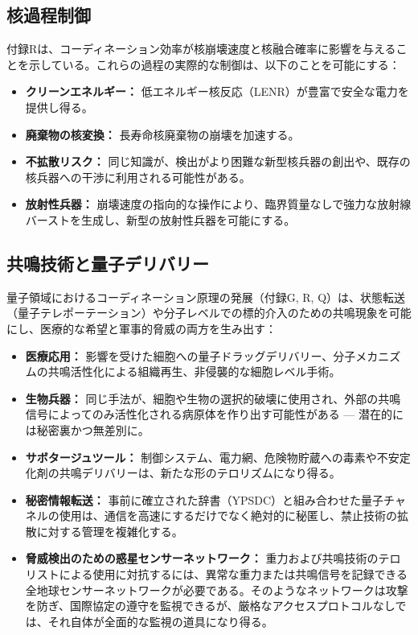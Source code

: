 \documentclass[12pt,a4paper]{article}
\theoremstyle{remark}
\begin{document}
	\subsection{核過程制御}
	\label{subsec:nuclear}
	
	付録Rは、コーディネーション効率が核崩壊速度と核融合確率に影響を与えることを示している。これらの過程の実際的な制御は、以下のことを可能にする：
	\begin{itemize}[leftmargin=*]
		\item \textbf{クリーンエネルギー：} 低エネルギー核反応（LENR）が豊富で安全な電力を提供し得る。
		\item \textbf{廃棄物の核変換：} 長寿命核廃棄物の崩壊を加速する。
		\item \textbf{不拡散リスク：} 同じ知識が、検出がより困難な新型核兵器の創出や、既存の核兵器への干渉に利用される可能性がある。
		\item \textbf{放射性兵器：} 崩壊速度の指向的な操作により、臨界質量なしで強力な放射線バーストを生成し、新型の放射性兵器を可能にする。
	\end{itemize}
	
	\subsection{共鳴技術と量子デリバリー}
	\label{subsec:resonance}
	
	量子領域におけるコーディネーション原理の発展（付録G, R, Q）は、状態転送（量子テレポーテーション）や分子レベルでの標的介入のための共鳴現象を可能にし、医療的な希望と軍事的脅威の両方を生み出す：
	\begin{itemize}[leftmargin=*]
		\item \textbf{医療応用：} 影響を受けた細胞への量子ドラッグデリバリー、分子メカニズムの共鳴活性化による組織再生、非侵襲的な細胞レベル手術。
		\item \textbf{生物兵器：} 同じ手法が、細胞や生物の選択的破壊に使用され、外部の共鳴信号によってのみ活性化される病原体を作り出す可能性がある — 潜在的には秘密裏かつ無差別に。
		\item \textbf{サボタージュツール：} 制御システム、電力網、危険物貯蔵への毒素や不安定化剤の共鳴デリバリーは、新たな形のテロリズムになり得る。
		\item \textbf{秘密情報転送：} 事前に確立された辞書（YPSDC）と組み合わせた量子チャネルの使用は、通信を高速にするだけでなく絶対的に秘匿し、禁止技術の拡散に対する管理を複雑化する。
		\item \textbf{脅威検出のための惑星センサーネットワーク：} 重力および共鳴技術のテロリストによる使用に対抗するには、異常な重力または共鳴信号を記録できる全地球センサーネットワークが必要である。そのようなネットワークは攻撃を防ぎ、国際協定の遵守を監視できるが、厳格なアクセスプロトコルなしでは、それ自体が全面的な監視の道具になり得る。
	\end{itemize}
	
\end{document}
